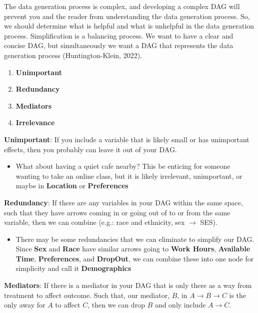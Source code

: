 \documentclass[
]{book}
\providecommand{\tightlist}{%
  \setlength{\itemsep}{0pt}\setlength{\parskip}{0pt}}
\begin{document}
The data generation process is complex, and developing a complex DAG will prevent you and the reader from understanding the data generation process. So, we should determine what is helpful and what is unhelpful in the data generation process. Simplification is a balancing process. We want to have a clear and concise DAG, but simultaneously we want a DAG that represents the data generation process (Huntington-Klein, 2022).

\begin{enumerate}
\def\labelenumi{\arabic{enumi}.}
\tightlist
\item
  \textbf{Unimportant}
\item
  \textbf{Redundancy}
\item
  \textbf{Mediators}
\item
  \textbf{Irrelevance}
\end{enumerate}

\textbf{Unimportant}: If you include a variable that is likely small or has unimportant effects, then you probably can leave it out of your DAG.

\begin{itemize}
\tightlist
\item
  What about having a quiet cafe nearby? This be enticing for someone wanting to take an online class, but it is likely irrelevant, unimportant, or maybe in \textbf{Location} or \textbf{Preferences}
\end{itemize}

\textbf{Redundancy}: If there are any variables in your DAG within the same space, such that they have arrows coming in or going out of to or from the same variable, then we can combine (e.g.: race and ethnicity, sex \(\rightarrow\) SES).

\begin{itemize}
\tightlist
\item
  There may be some redundancies that we can eliminate to simplify our DAG. Since \textbf{Sex} and \textbf{Race} have similar arrows going to \textbf{Work Hours}, \textbf{Available Time}, \textbf{Preferences}, and \textbf{DropOut}, we can combine these into one node for simplicity and call it \textbf{Demographics}
\end{itemize}

\textbf{Mediators}: If there is a mediator in your DAG that is only there as a way from treatment to affect outcome. Such that, our mediator, \(B\), in \(A \rightarrow B \rightarrow C\) is the only away for \(A\) to affect \(C\), then we can drop \(B\) and only include \(A \rightarrow C\).
\end{document}
